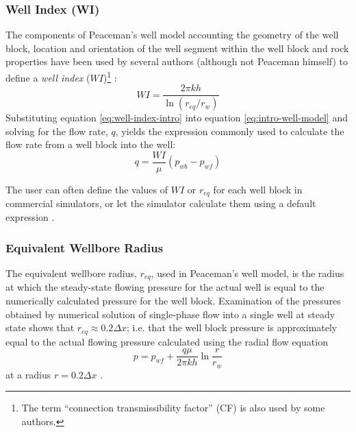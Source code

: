 \subsubsection{Well Index (WI)} %
\label{ssub:well_index_}
The components of Peaceman's well model accounting the geometry of the well block, location and orientation of the well segment within the well block and rock properties have been used by several authors (although not Peaceman himself) to define a \emph{well index} ($WI$)\footnote{The term ``connection transmissibility factor'' (CF) is also used by some authors\cite{Peaceman2003New,Schlumberger2013Eclipse}.} \cite{Wolfsteiner2003Calculation}:
\begin{equation}
    \label{eq:well-index-intro}
    WI = \frac{2\pi kh}{\ln \left(r_{eq}/r_{w}\right)}
\end{equation}
Substituting equation \eqref{eq:well-index-intro} into equation \eqref{eq:intro-well-model} and solving for the flow rate, $q$, yields the expression commonly used to calculate the flow rate from a well block into the well:
\begin{equation}
    \label{eq:wolfsteiner-well-index-multiple-blocks}
    q = \frac{WI}{\mu} \left( p_{wb} - p_{wf} \right)
\end{equation}

The user can often define the values of $WI$ or $r_{eq}$ for each well block in commercial simulators, or let the simulator calculate them using a default expression \cite{Peaceman2003New}.

\subsubsection{Equivalent Wellbore Radius} %
\label{ssub:equivalent_wellbore_radius}
The equivalent wellbore radius, $r_{eq}$, used in Peaceman's well model, is the radius at which the steady-state flowing pressure for the actual well is equal to the numerically calculated pressure for the well block. Examination of the pressures obtained by numerical solution of single-phase flow into a single well at steady state shows that $r_{eq} \approx 0.2 \Delta x$; i.e. that the well block pressure is approximately equal to the actual flowing pressure calculated using the radial flow equation \cite{Dake1978Developments}
\begin{equation}
    p = p_{wf} + \frac{q\mu}{2\pi kh} \ln{\frac{r}{r_w}}
\end{equation}
 at a radius $r = 0.2 \Delta x$ \cite{Peaceman1978Interpretation}.

